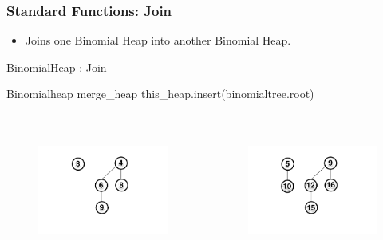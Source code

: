 \documentclass[13pt]{beamer}
\begin{document}
\begin{frame}
\frametitle{Standard Functions: Join}
  \begin{itemize}
    \item Joins one Binomial Heap into another Binomial Heap. 
  \end{itemize}

  \begin{algorithm}[H]
    \small
    \caption{BinomialHeap : Join}
    \begin{algorithmic}
      \REQUIRE Binomialheap merge\_heap
        \STATE this\_heap.insert(binomialtree.root)
      \ENDFOR
    \end{algorithmic}
  \end{algorithm}

  \begin{columns}[T] %
    \begin{column}[T]{5.5cm} %
       \begin{figure}
        \includegraphics[height=4.35cm]{./img/joinorig.png}
      \end{figure}
    \end{column}
    \begin{column}[T]{5.5cm} %
      \begin{figure}
        \includegraphics[height=4.35cm]{./img/joinnew.png}
      \end{figure}
    \end{column}
  \end{columns}

\end{frame}
\end{document}
